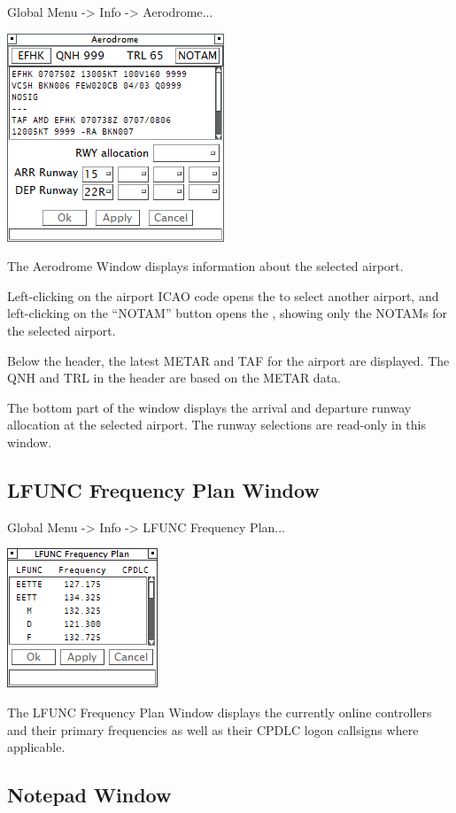\documentclass[11pt,a4paper]{memoir}
\begin{document}
Global Menu -> Info -> Aerodrome...

\includegraphics{img/adinfo.png}

The Aerodrome Window displays information about the selected airport.

Left-clicking on the airport ICAO code opens the \textit{} to select another airport, and left-clicking on the “NOTAM” button opens the \textit{}, showing only the NOTAMs for the selected airport.

Below the header, the latest METAR and TAF for the airport are displayed. The QNH and TRL in the header are based on the METAR data.

The bottom part of the window displays the arrival and departure runway allocation at the selected airport. The runway selections are read-only in this window.

\subsection{LFUNC Frequency Plan Window}
\label{win:lfunc}

Global Menu -> Info -> LFUNC Frequency Plan...

\includegraphics{img/lfunc.png}

The LFUNC Frequency Plan Window displays the currently online controllers and their primary frequencies as well as their CPDLC logon callsigns where applicable.

\subsection{Notepad Window}
\label{win:note}
\end{document}
